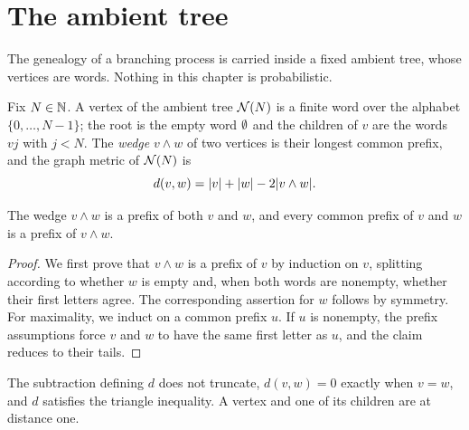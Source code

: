 \chapter{The ambient tree}
\label{ch:tree}

The genealogy of a branching process is carried inside a fixed ambient tree, whose vertices
are words. Nothing in this chapter is probabilistic.

\begin{definition}
\label{def:word}
\leanok
Fix $N\in\mathbb{N}$. A vertex of the ambient tree $\mathcal{N}(N)$ is a finite word over the alphabet
$\{0,\dots,N-1\}$; the root is the empty word $\emptyset$ and the children of $v$ are the words
$v j$ with $j<N$. The \emph{wedge} $v\wedge w$ of two vertices is their longest common
prefix, and the graph metric of $\mathcal{N}(N)$ is
\[
  d(v,w)=\lvert v \rvert+\lvert w \rvert-2\lvert v\wedge w \rvert.
\]
\end{definition}

\begin{lemma}
\label{lem:wedge}
\leanok
The wedge $v\wedge w$ is a prefix of both $v$ and $w$, and every common prefix of $v$ and $w$
is a prefix of $v\wedge w$.
\end{lemma}

\begin{proof}
\leanok
We first prove that $v\wedge w$ is a prefix of $v$ by induction on $v$, splitting according
to whether $w$ is empty and, when both words are nonempty, whether their first letters
agree. The corresponding assertion for $w$ follows by symmetry. For maximality, we induct
on a common prefix $u$. If $u$ is nonempty, the prefix assumptions force $v$ and $w$ to have
the same first letter as $u$, and the claim reduces to their tails.
\end{proof}

\begin{lemma}
\label{lem:treeDist}
\leanok
The subtraction defining $d$ does not truncate, $d(v,w)=0$ exactly when $v=w$, and $d$
satisfies the triangle inequality. A vertex and one of its children are at distance one.
\end{lemma}

